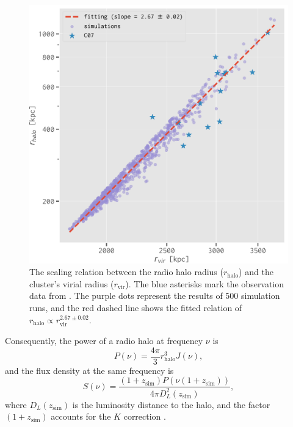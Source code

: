 \documentclass[twocolumn]{aastex62}
\newcommand{\R}[1]{\mathrm{#1}}
\newcommand{\editone}[1]{{\leavevmode\color{cyan}#1}}
\begin{document}
\begin{figure}
  \centering
  \includegraphics[width=\columnwidth]{halo-radius-rvir}
  \caption{\label{fig:halo-radius}\editone{%
    The scaling relation between the radio halo radius ($r_{\R{halo}}$) and
    the cluster's virial radius ($r_{\R{vir}}$).
    The blue asterisks mark the observation data from \citet{cassano2007}.
    The purple dots represent the results of 500 simulation runs, and the red
    dashed line shows the fitted relation of
    $r_{\R{halo}} \propto r_{\R{vir}}^{2.67 \pm 0.02}$.
  }}
\end{figure}

Consequently, the power of a radio halo at frequency $\nu$ is
\begin{equation}
  \label{eq:halo-power}
  P(\nu) = \frac{4\pi}{3} r_{\R{halo}}^3 J(\nu),
\end{equation}
and the flux density at the same frequency is
\begin{equation}
  \label{eq:halo-flux}
  S(\nu) = \frac{(1+z_{\R{sim}}) P(\nu(1+z_{\R{sim}}))}
    {4\pi D_{\!L}^2(z_{\R{sim}})} ,
\end{equation}
where $D_{\!L}(z_{\R{sim}})$ is the luminosity distance to the halo,
and the factor $(1 + z_{\R{sim}})$ accounts for the $K$ correction
\citep[e.g.,][]{hogg1999}.


\end{document}
